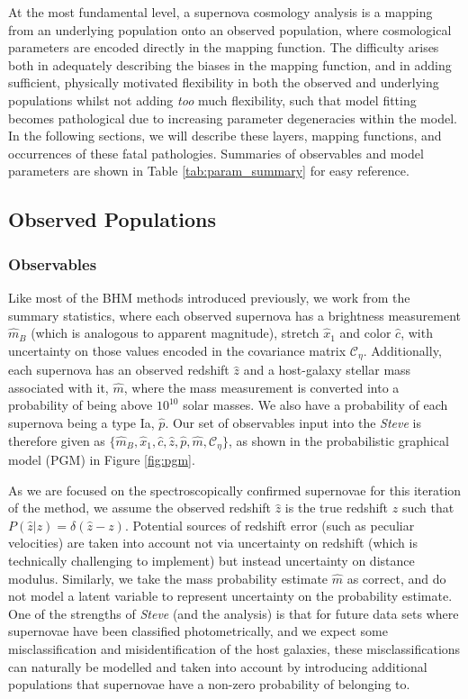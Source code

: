\documentclass[a4paper,fleqn,usenatbib,manuscript]{emulateapj}
\newcommand{\cov}{\mathcal{C}_\eta}
\newcommand{\steve}{\textit{Steve}}
\newcommand{\rubin}{\citetalias{Rubin2015}}
\begin{document}
At the most fundamental level, a supernova cosmology analysis is a mapping from an underlying population onto an observed population, where cosmological parameters are encoded directly in the mapping function. The difficulty arises both in adequately describing the biases in the mapping function, and in adding sufficient, physically motivated flexibility in both the observed and underlying populations whilst not adding \textit{too} much flexibility, such that model fitting becomes pathological due to increasing parameter degeneracies within the model. In the following sections, we will describe these layers, mapping functions, and occurrences of these fatal pathologies. Summaries of observables and model parameters are shown in Table \ref{tab:param_summary} for easy reference.


\subsection{Observed Populations}

\subsubsection{Observables}
Like most of the BHM methods introduced previously, we work from the summary statistics, where each observed supernova has a brightness measurement $\hat{m}_B$ (which is analogous to apparent magnitude), stretch $\hat{x}_1$ and color $\hat{c}$, with uncertainty on those values encoded in the covariance matrix $\cov$. Additionally, each supernova has an observed redshift $\hat{z}$ and a host-galaxy stellar mass associated with it, $\hat{m}$, where the mass measurement is converted into a probability of being above $10^{10}$ solar masses. We also have a probability of each supernova being a type Ia, $\hat{p}$. Our set of observables input into the {\steve} is therefore given as $\lbrace \hat{m}_B, \hat{x}_1, \hat{c}, \hat{z}, \hat{p}, \hat{m}, \cov \rbrace$, as shown in the probabilistic graphical model (PGM) in Figure \ref{fig:pgm}.


As we are focused on the spectroscopically confirmed supernovae for this iteration of the method, we assume the observed redshift $\hat{z}$ is the true redshift $z$ such that $P(\hat{z}|z) = \delta(\hat{z} - z)$. Potential sources of redshift error (such as peculiar velocities) are taken into account not via uncertainty on redshift (which is technically challenging to implement) but instead uncertainty on distance modulus. Similarly, we take the mass probability estimate $\hat{m}$ as correct, and do not model a latent variable to represent uncertainty on the probability estimate. One of the strengths of {\steve} (and the {\rubin} analysis) is that for future data sets where supernovae have been classified photometrically, and we expect some misclassification and misidentification of the host galaxies, these misclassifications can naturally be modelled and taken into account by introducing additional populations that supernovae have a non-zero probability of belonging to.
\end{document}
